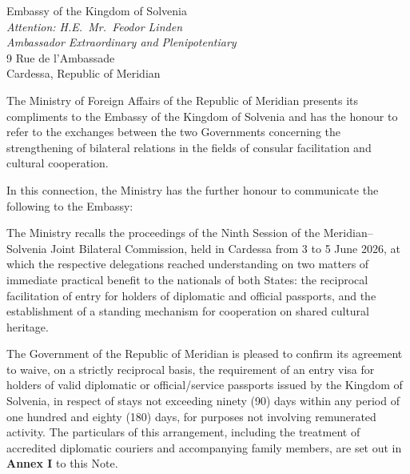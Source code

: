 \documentclass[%
  fontsize=11pt,
  paper=a4,
  parskip=half,
  fromalign=false,
  fromrule=false,
  fromphone=false,
  fromfax=false,
  fromemail=false,
  fromurl=false,
  addrfield=true,
  backaddress=false,
  subject=titled,
  foldmarks=false,
  refline=narrow,
  enlargefirstpage=false,
  pagenumber=botcenter
]{scrlttr2}
\begin{document}
\begin{letter}{%
Embassy of the Kingdom of Solvenia\\
\textit{Attention: H.E.\ Mr.\ Feodor Linden}\\
\textit{Ambassador Extraordinary and Plenipotentiary}\\
9 Rue de l'Ambassade\\
Cardessa, Republic of Meridian}


\opening{The Ministry of Foreign Affairs of the Republic of Meridian presents its
compliments to the Embassy of the Kingdom of Solvenia and has the honour to
refer to the exchanges between the two Governments concerning the
strengthening of bilateral relations in the fields of consular facilitation
and cultural cooperation.}

In this connection, the Ministry has the further honour to communicate the
following to the Embassy:

\begin{notepara}

\item The Ministry recalls the proceedings of the Ninth Session of the
Meridian--Solvenia Joint Bilateral Commission, held in Cardessa from 3 to 5
June 2026, at which the respective delegations reached understanding on two
matters of immediate practical benefit to the nationals of both States: the
reciprocal facilitation of entry for holders of diplomatic and official
passports, and the establishment of a standing mechanism for cooperation on
shared cultural heritage.

\item The Government of the Republic of Meridian is pleased to confirm its
agreement to waive, on a strictly reciprocal basis, the requirement of an
entry visa for holders of valid diplomatic or official/service passports
issued by the Kingdom of Solvenia, in respect of stays not exceeding ninety
(90) days within any period of one hundred and eighty (180) days, for
purposes not involving remunerated activity. The particulars of this
arrangement, including the treatment of accredited diplomatic couriers and
accompanying family members, are set out in \textbf{Annex I} to this Note.


\end{notepara}
\end{letter}
\end{document}
